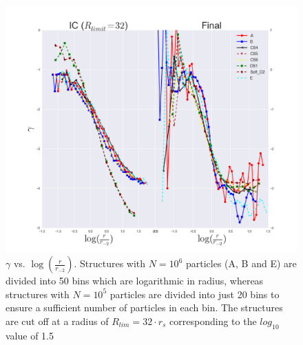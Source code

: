 \begin{figure}[!htbp]
\centering
\includegraphics[width=1.0\linewidth]{img/Fig_logr_r2_gamma_ABCS4CS5CS6DS1D2E_IC_Final_R_limit_32.png}
\caption{$\gamma$ vs. $\log (\frac{r}{r_{-2}})$. Structures with $N = 10^6$ particles (A, B and E) are divided into 50 bins which are logarithmic in radius, whereas structures with $N = 10^5$ particles are divided into just 20 bins to ensure a sufficient number of particles in each bin. The structures are cut off at a radius of $R_{lim} = 32\cdot r_s$ corresponding to the $log_{10}$ value of 1.5}
\label{fig:test}
\end{figure}

